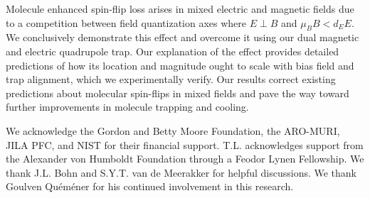 \documentclass[%
 reprint,
 amsmath,amssymb,
 aps,
prl,
]{revtex4-1}
\newcommand{\epb}{{$E\!\perp\!B$}}
\begin{document}
Molecule enhanced spin-flip loss arises in mixed electric and magnetic fields due to a competition between field quantization axes where \epb{} and $\mu_BB<d_EE$. We conclusively demonstrate this effect and overcome it using our dual magnetic and electric quadrupole trap. Our explanation of the effect provides detailed predictions of how its location and magnitude ought to scale with bias field and trap alignment, which we experimentally verify. Our results correct existing predictions about molecular spin-flips in mixed fields and pave the way toward further improvements in molecule trapping and cooling.

We acknowledge the Gordon and Betty Moore Foundation, the ARO-MURI, JILA PFC, and NIST for their financial support. T.L. acknowledges support from the Alexander von Humboldt Foundation through a Feodor Lynen Fellowship. We thank J.L. Bohn and S.Y.T. van de Meerakker for helpful discussions. We thank Goulven Qu\'em\'ener for his continued involvement in this research.


\end{document}

